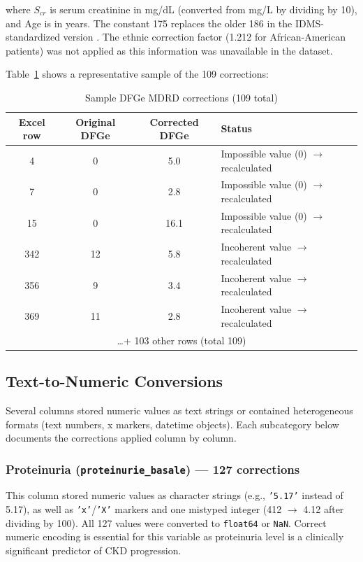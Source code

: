 \documentclass[12pt,a4paper,twoside]{report}
\begin{document}
where $S_{cr}$ is serum creatinine in mg/dL (converted from mg/L by dividing by 10), and Age is in years. The constant 175 replaces the older 186 in the IDMS-standardized version \cite{levey_mdrd_2006}. The ethnic correction factor (1.212 for African-American patients) was not applied as this information was unavailable in the dataset.

Table~\ref{tab:mdrd_sample} shows a representative sample of the 109 corrections:

\begin{table}[htbp]
\centering
\caption{Sample DFGe MDRD corrections (109 total)}
\label{tab:mdrd_sample}
\begin{tabularx}{\textwidth}{cccX}
\toprule
\textbf{Excel row} & \textbf{Original DFGe} & \textbf{Corrected DFGe} & \textbf{Status} \\
\midrule
4 & 0 & 5.0 & Impossible value (0) $\rightarrow$ recalculated \\
7 & 0 & 2.8 & Impossible value (0) $\rightarrow$ recalculated \\
15 & 0 & 16.1 & Impossible value (0) $\rightarrow$ recalculated \\
342 & 12 & 5.8 & Incoherent value $\rightarrow$ recalculated \\
356 & 9 & 3.4 & Incoherent value $\rightarrow$ recalculated \\
369 & 11 & 2.8 & Incoherent value $\rightarrow$ recalculated \\
\multicolumn{4}{c}{\ldots + 103 other rows (total 109)} \\
\bottomrule
\end{tabularx}
\end{table}

\subsection{Text-to-Numeric Conversions}

Several columns stored numeric values as text strings or contained heterogeneous formats (text numbers, x markers, datetime objects). Each subcategory below documents the corrections applied column by column.

\subsubsection{Proteinuria (\texttt{proteinurie\_basale}) — 127 corrections}

This column stored numeric values as character strings (e.g., \texttt{'5.17'} instead of 5.17), as well as \texttt{'x'}/\texttt{'X'} markers and one mistyped integer (412 $\rightarrow$ 4.12 after dividing by 100). All 127 values were converted to \texttt{float64} or \texttt{NaN}. Correct numeric encoding is essential for this variable as proteinuria level is a clinically significant predictor of CKD progression.
\end{document}

